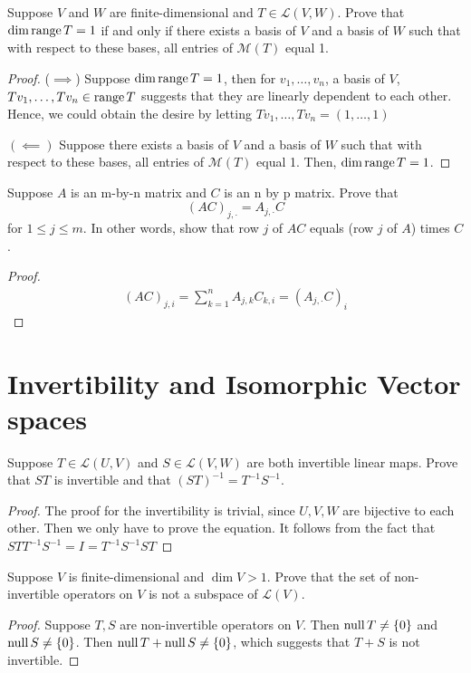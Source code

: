 \begin{exercise}
Suppose $V$ and $W$ are finite-dimensional and $T \in \mathcal{L}(V,W)$. Prove that $\operatorname{dim}\mathop{\mathrm{range}} T = 1$ if and only if there exists a basis of $V$ and a basis of $W$ such that with respect to these bases, all entries of $\mathcal{M}(T)$ equal 1.
\end{exercise}
\begin{proof}
	($\implies$) Suppose $\operatorname{dim}\mathop{\mathrm{range}} T = 1$, then for $v_1, \ldots ,v_n$, a basis of $V$, $Tv_1, \ldots ,Tv_n \in \mathop{\mathrm{range}} T$ suggests that they are linearly dependent to each other. Hence, we could obtain the desire by letting $Tv_1, \ldots ,Tv_n = (1, \ldots ,1)$

	$(\impliedby)$ Suppose there exists a basis of $V$ and a basis of $W$ such that with respect to these bases, all entries of $\mathcal{M}(T)$ equal 1. Then, $\operatorname{dim}\mathop{\mathrm{range}} T = 1$.
\end{proof}

\begin{exercise}
Suppose $A$ is an m-by-n matrix and $C $ is an n by p matrix. Prove that \[
	(AC)_{j,\cdot} = A_{j, \cdot }C\]
for $1 \le j \le m$. In other words, show that row $j$ of $AC$ equals (row $j$ of $A$) times $C$.
\end{exercise}
\begin{proof}
	\begin{align*}
		(AC)_{j,i} = \sum_{k=1}^n A_{j,k}C_{k,i} = (A_{j, \cdot}C)_{i}
	\end{align*}
\end{proof}

\newpage

\section{Invertibility and Isomorphic Vector spaces}

\begin{exercise}
Suppose $T \in \mathcal{L}(U,V)$ and $S \in \mathcal{L}(V,W)$ are both invertible linear maps. Prove that $ST$ is invertible and that \((ST)^{-1} = T^{-1}S^{-1}\).
\end{exercise}
\begin{proof}
	The proof for the invertibility is trivial, since $U, V, W$ are bijective to each other. Then we only have to prove the equation.
	It follows from the fact that $ST T^{-1}S^{-1} = I = T^{-1}S^{-1} ST$
\end{proof}

\begin{exercise}
Suppose $V$ is finite-dimensional and $\operatorname{dim}V > 1$. Prove that the set of non-invertible operators on $V$ is not a subspace of $\mathcal{L}(V)$.
\end{exercise}
\begin{proof}
	Suppose $T, S$ are non-invertible operators on $V$. Then $\mathop{\mathrm{null}} T \neq \{0\}$ and $\mathop{\mathrm{null}} S \neq \{0\}$. Then $\mathop{\mathrm{null}} T + \mathop{\mathrm{null}} S \neq \{0\}$, which suggests that $T + S$ is not invertible.
\end{proof}

